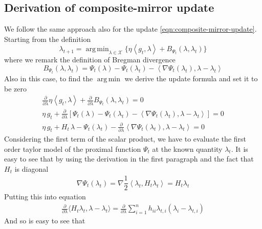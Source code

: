 \documentclass[notitlepage]{article}
\DeclareMathOperator*{\argmin}{arg\,min}
\begin{document}
\subsection{Derivation of composite-mirror update}
We follow the same approach also for the update \eqref{eqn:composite-mirror-update}. Starting from the definition
\[
  \lambda_{t+1} = \argmin_{\lambda \in \mathcal{X}} \{ \eta \left\langle g_t,\lambda \right\rangle + B_{\Psi_t} (\lambda,\lambda_t) \}
\]
where we remark the definition of Bregman divergence
\[
  B_{\Psi_t} (\lambda,\lambda_t) = \Psi_t(\lambda) - \Psi_t(\lambda_t) - \left\langle \nabla \Psi_t(\lambda_t),\lambda-\lambda_t \right\rangle  
\]
Also in this case, to find the $\argmin$ we derive the update formula and set it to be zero
\begin{align*}
  \frac{\partial}{\partial \lambda} \eta \left\langle g_t,\lambda \right\rangle + \frac{\partial}{\partial \lambda} B_{\Psi_t} (\lambda,\lambda_t) = 0 \\ 
  \eta\, g_t + \frac{\partial}{\partial \lambda} \left[ \Psi_t(\lambda) - \Psi_t(\lambda_t) - \left\langle \nabla \Psi_t(\lambda_t),\lambda-\lambda_t \right\rangle \right] = 0 \\
  \eta\, g_t + H_t\, \lambda - \Psi_t(\lambda_t) - \frac{\partial}{\partial \lambda} \left\langle \nabla \Psi_t(\lambda_t),\lambda-\lambda_t \right\rangle = 0
\end{align*}
Considering the first term of the scalar product, we have to evaluate the first order taylor model of the proximal function $\Psi_t$ at the
known quantity $\lambda_t$. It is easy to see that by using the derivation in the first paragraph and the fact that $H_t$ is diagonal
\begin{align*}
  \nabla \Psi_t(\lambda_t) = \nabla \dfrac{1}{2} \left\langle \lambda_t, H_t \lambda_t \right\rangle = H_t \lambda_t
\end{align*}
Putting this into equation
\begin{align*}
  \frac{\partial}{\partial \lambda} \langle H_t \lambda_t, \lambda - \lambda_t \rangle = \frac{\partial}{\partial \lambda} \sum_{i=1}^n h_{ii} \lambda_{t,i} (\lambda_i - \lambda_{t,i})
\end{align*}
And so is easy to see that
\end{document}
